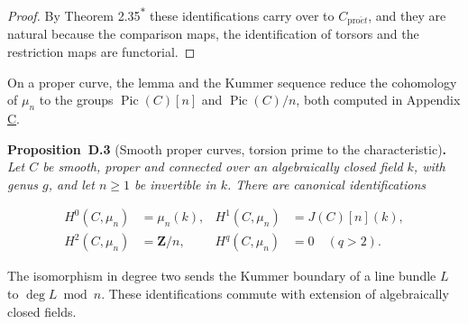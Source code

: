 \documentclass[11pt]{article}
\newenvironment{bpstatement}[2]{\par\addvspace{0.6\baselineskip}\noindent\textbf{#1}#2\textbf{.}\enspace\ignorespaces}
  {\par\addvspace{0.4\baselineskip}}
\newenvironment{bpstatementit}[2]{\begin{bpstatement}{#1}{#2}\itshape\ignorespaces}{\end{bpstatement}}
\newcommand{\bpout}[1]{#1\textsuperscript{\hyperlink{bp-outside}{\ensuremath{\ast}}}}
\begin{document}
\begin{proof}[{Proof}]
By Theorem \bpout{2.35} these identifications carry over to \(C_{\mathrm{pro}\acute{e}t}\), and they are natural because the comparison maps, the identification of torsors and the restriction maps are functorial.
\end{proof}

\label{bp180}%
On a proper curve, the lemma and the Kummer sequence reduce the cohomology of \(\mu_n\) to the groups \(\operatorname{Pic}(C)[n]\) and \(\operatorname{Pic}(C)/n\), both computed in Appendix \hyperref[bp119]{C}.

\label{bp181}%
\begin{bpstatementit}{Proposition~D.3}{ (Smooth proper curves, torsion prime to the characteristic)}
Let \(C\) be smooth, proper and connected over an algebraically closed field \(k\), with genus \(g\), and let \(n\geq1\) be invertible in \(k\). There are canonical identifications

\[
\begin{aligned}
H^0(C,\mu_n)&=\mu_n(k),&
H^1(C,\mu_n)&=J(C)[n](k),\\
H^2(C,\mu_n)&=\mathbf Z/n,&
H^q(C,\mu_n)&=0\quad(q>2).
\end{aligned}
\]

The isomorphism in degree two sends the Kummer boundary of a line bundle \(L\) to \(\deg L\bmod n\).  These identifications commute with extension of algebraically closed fields.
\end{bpstatementit}
\end{document}
